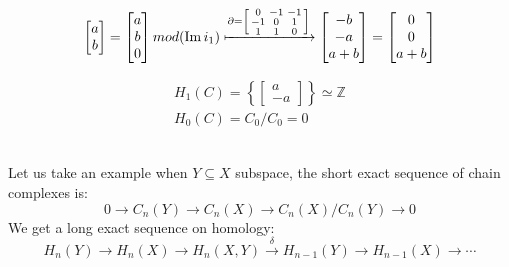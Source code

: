\documentclass[11pt,a4paper]{report}
\DeclareMathOperator{\Ima}{Im}
\begin{document}
\begin{Ex}
                \begin{align*}
                  \begin{bmatrix}
                    a\\b
                  \end{bmatrix}
                  =
                  \begin{bmatrix}
                    a\\b\\0
                  \end{bmatrix} mod(\Ima i_1) \xmapsto{\partial = \left[\begin{smallmatrix}0&-1&-1\\-1&0&1\\1&1&0\end{smallmatrix}\right]} \begin{bmatrix}
                    -b\\-a\\a+b
                  \end{bmatrix}
                  =
                  \begin{bmatrix}
                    0\\0\\a+b
                  \end{bmatrix}
                \end{align*}

                \begin{align*}
                  H_1(C) = \left\{\begin{bmatrix}a\\-a\end{bmatrix}\right\} \simeq \mathbb{Z} \\
                  H_0(C) = C_0 / C_0 = 0
                \end{align*}
                \\
                \end{Ex}
                Let us take an example when $Y \subseteq X$ subspace, the short exact sequence of chain complexes is: \\
                \[ 
                0 \rightarrow C_n(Y) \rightarrow C_n(X) \rightarrow C_n(X) / C_n(Y) \rightarrow 0
                \] 
                We get a long exact sequence on homology: \\
                \[ H_n(Y) \rightarrow H_n(X) \rightarrow H_n(X, Y) \xrightarrow{\delta} H_{n-1}(Y) \rightarrow H_{n-1}(X) \rightarrow \cdots \]
\end{document}
